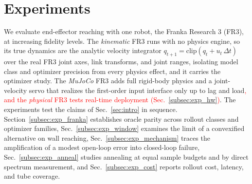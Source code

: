 \documentclass[letterpaper,10pt,conference]{ieeeconf}
\newcommand{\nd}[1]{\textcolor{red}{#1}}
\begin{document}
\section{Experiments}\label{sec:exp}
We evaluate end-effector reaching with one robot, the Franka Research 3 (FR3), at increasing fidelity levels.
The \emph{kinematic} FR3 runs with no physics engine, so its true dynamics are the analytic velocity integrator $q_{t+1} = \mathrm{clip}(q_t + u_t\,\Delta t)$ over the real FR3 joint axes, link transforms, and joint ranges, isolating model class and optimizer precision from every physics effect, and it carries the optimizer study.
The \emph{MuJoCo} FR3 adds full rigid-body physics and a joint-velocity servo that realizes the first-order input interface only up to lag and load\nd{, and the \emph{physical} FR3 tests real-time deployment (Sec.~\ref{subsec:exp_hw})}.
The experiments test the claims of Sec.~\ref{sec:intro} in sequence. Section~\ref{subsec:exp_franka} establishes oracle parity across rollout classes and optimizer families, Sec.~\ref{subsec:exp_window} examines the limit of a convexified alternative on wall reaching, Sec.~\ref{subsec:exp_mechanism} traces the amplification of a modest open-loop error into closed-loop failure, Sec.~\ref{subsec:exp_anneal} studies annealing at equal sample budgets and by direct spectrum measurement, and Sec.~\ref{subsec:exp_cost} reports rollout cost, latency, and tube coverage.
\end{document}
